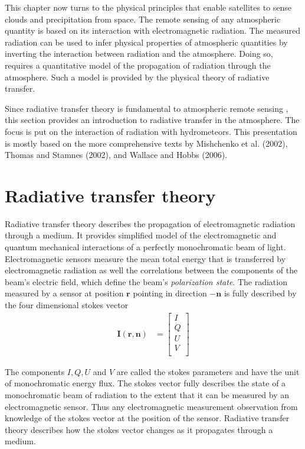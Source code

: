 
This chapter now turns to the physical principles that enable satellites to
sense clouds and precipitation from space. The remote sensing of any atmospheric
quantity is based on its interaction with electromagnetic radiation. The
measured radiation can be used to infer physical properties of atmospheric
quantities by inverting the interaction between radiation and the atmosphere.
Doing so, requires a quantitative model of the propagation of radiation through
the atmosphere. Such a model is provided by the physical theory of radiative
transfer.

Since radiative transfer theory is fundamental to atmospheric remote sensing ,
this section provides an introduction to radiative transfer in the atmosphere.
The focus is put on the interaction of radiation with hydrometeors. This
presentation is mostly based on the more comprehensive texts by Mishchenko et
al. (2002), Thomas and Stamnes (2002), and Wallace and Hobbs (2006).


\section{Radiative transfer theory}

Radiative transfer theory describes the propagation of electromagnetic radiation
through a medium. It provides simplified model of the electromagnetic and
quantum mechanical interactions of a perfectly monochromatic beam of light.
Electromagnetic sensors measure the mean total energy that is transferred by
electromagnetic radiation as well the correlations between the components of the
beam's electric field, which define the beam's \textit{polarization state}. The
radiation measured by a sensor at position $\bm{r}$ pointing in direction
$\bm{-n}$ is fully described by the four dimensional stokes vector
\begin{align}
  \bm{I}(\bm{r}, \bm{n}) &= \left [ \begin{array}{c}
    I \\
    Q \\
    U \\
    V \\
    \end{array} \right ]
\end{align}

The components $I, Q, U$ and $V$ are called the stokes parameters and have the
unit of monochromatic energy flux. The stokes vector fully describes the state
of a monochromatic beam of radiation to the extent that it can be measured by an
electromagnetic sensor. Thus any electromagnetic measurement observation from
knowledge of the stokes vector at the position of the sensor. Radiative transfer
theory describes how the stokes vector changes as it propagates through a medium.

